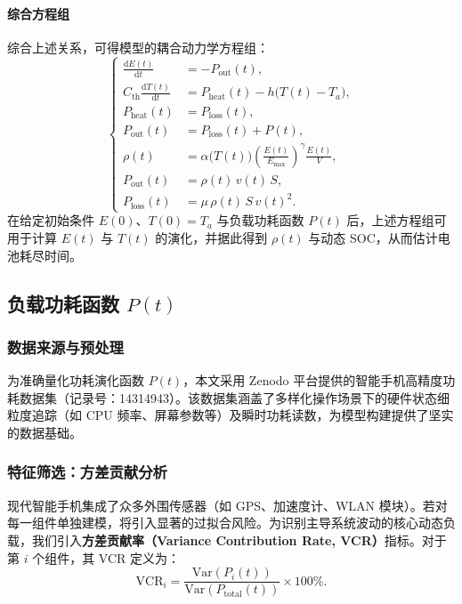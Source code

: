 \documentclass[11pt]{article}
\begin{document}
\paragraph{综合方程组}
综合上述关系，可得模型的耦合动力学方程组：
\begin{equation}
\left\{
\begin{aligned}
  \frac{\mathrm{d}E(t)}{\mathrm{d}t} &= -P_{\text{out}}(t),\\
  C_{\text{th}}\frac{\mathrm{d}T(t)}{\mathrm{d}t} &= P_{\text{heat}}(t) - h\bigl(T(t)-T_a\bigr),\\
  P_{\text{heat}}(t) &= P_{\text{loss}}(t),\\
  P_{\text{out}}(t) &= P_{\text{loss}}(t) + P(t),\\
  \rho(t) &= \alpha\!\bigl(T(t)\bigr)\left(\frac{E(t)}{E_{\max}}\right)^{\gamma}\frac{E(t)}{V},\\
  P_{\text{out}}(t) &= \rho(t)\,v(t)\,S,\\
  P_{\text{loss}}(t) &= \mu\,\rho(t)\,S\,v(t)^2.
\end{aligned}
\right.
\end{equation}
在给定初始条件 $E(0)$、$T(0)=T_a$ 与负载功耗函数 $P(t)$ 后，上述方程组可用于计算 $E(t)$ 与 $T(t)$ 的演化，并据此得到 $\rho(t)$ 与动态 SOC，从而估计电池耗尽时间。


\subsection{负载功耗函数 $P(t)$}

\subsubsection{数据来源与预处理}
为准确量化功耗演化函数 $P(t)$，本文采用 Zenodo 平台提供的智能手机高精度功耗数据集（记录号：14314943）。该数据集涵盖了多样化操作场景下的硬件状态细粒度追踪（如 CPU 频率、屏幕参数等）及瞬时功耗读数，为模型构建提供了坚实的数据基础。

\subsubsection{特征筛选：方差贡献分析}
现代智能手机集成了众多外围传感器（如 GPS、加速度计、WLAN 模块）。若对每一组件单独建模，将引入显著的过拟合风险。为识别主导系统波动的核心动态负载，我们引入\textbf{方差贡献率（Variance Contribution Rate, VCR）}指标。对于第 $i$ 个组件，其 VCR 定义为：
\begin{equation}
    \text{VCR}_i = \frac{\text{Var}(P_i(t))}{\text{Var}(P_{\text{total}}(t))} \times 100\%.
\end{equation}
\end{document}
